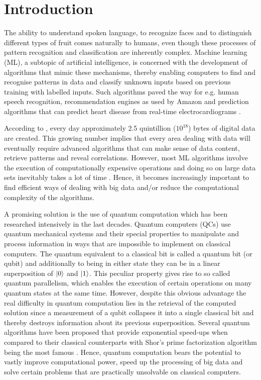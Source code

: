 \documentclass[a4paper]{article}
\newcommand*{\0}{$\ket{0}$}
\newcommand*{\1}{$\ket{1}$}
\begin{document}
\section{Introduction}
\label{sec:introduction}


The ability to understand spoken language, to recognize faces and to distinguish different types of fruit comes naturally to humans, even though these processes of pattern recognition and classification are inherently complex. Machine learning (ML), a subtopic of artificial intelligence, is concerned with the development of algorithms that mimic these mechanisms, thereby enabling computers to find and recognise patterns in data and classify unknown inputs based on previous training with labelled inputs. Such algorithms paved the way for e.g. human speech recognition, recommendation engines as used by Amazon and prediction algorithms that can predict heart disease from real-time electrocardiograms \citep{acharya2015integrated}.

According to \cite*{bigdata}, every day approximately 2.5 quintillion (${10}^{18}$) bytes of digital data are created. This growing number implies that every area dealing with data will eventually require advanced algorithms that can make sense of data content, retrieve patterns and reveal correlations. However, most ML algorithms involve the execution of computationally expensive operations and doing so on large data sets inevitably takes a lot of time \citep{bekkerman2011scaling}. Hence, it becomes increasingly important to find efficient ways of dealing with big data and/or reduce the computational complexity of the algorithms.

A promising solution is the use of quantum computation which has been researched intensively in the last decades. Quantum computers (QCs) use quantum mechanical systems and their special properties to manipulate and process information in ways that are impossible to implement on classical computers. The quantum equivalent to a classical bit is called a quantum bit (or qubit) and additionally to being in either state they can be in a linear superposition of \0 and \1. This peculiar property gives rise to so called quantum parallelism, which enables the execution of certain operations on many quantum states at the same time. However, despite this obvious advantage the real difficulty in quantum computation lies in the retrieval of the computed solution since a measurement of a qubit collapses it into a single classical bit and thereby destroys information about its previous superposition. Several quantum algorithms have been proposed that provide exponential speed-ups when compared to their classical counterparts with Shor's prime factorization algorithm being the most famous \citep{shor1994}. Hence, quantum computation bears the potential to vastly improve computational power, speed up the processing of big data and solve certain problems that are practically unsolvable on classical computers. 
\end{document}
